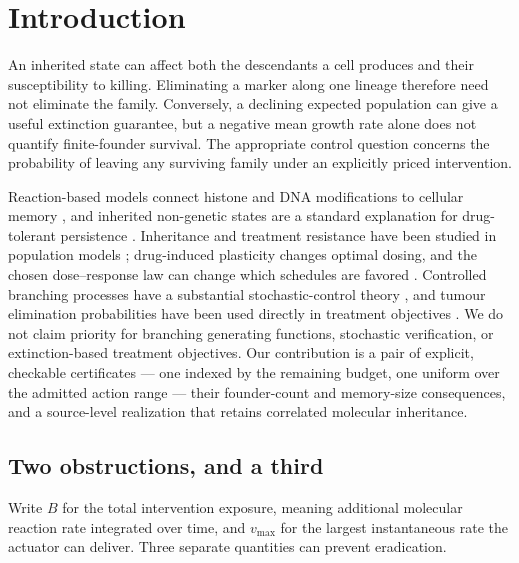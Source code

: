 \section{Introduction}
\label{sec:intro}

An inherited state can affect both the descendants a cell produces and their
susceptibility to killing. Eliminating a marker along one lineage therefore
need not eliminate the family. Conversely, a declining expected population can
give a useful extinction guarantee, but a negative mean growth rate alone does
not quantify finite-founder survival. The appropriate control question concerns
the probability of leaving any surviving family under an explicitly priced
intervention.

Reaction-based models connect histone and DNA modifications to cellular memory
\citep{dodd2007,bruno,bruno2024}, and inherited non-genetic states are a
standard explanation for drug-tolerant persistence
\citep{balaban2004,sharma2010,shaffer2017,oren2021}. Inheritance and treatment
resistance have been studied in population models \citep{cassidy}; drug-induced
plasticity changes optimal dosing, and the chosen dose--response law can change
which schedules are favored \citep{gunnarsson}. Controlled branching processes
have a substantial stochastic-control theory \citep{claisse,kimmel2015}, and
tumour elimination probabilities have been used directly in treatment
objectives \citep{burroughs}. We do not claim priority for branching generating
functions, stochastic verification, or extinction-based treatment objectives.
Our contribution is a pair of explicit, checkable certificates --- one indexed
by the remaining budget, one uniform over the admitted action range --- their
founder-count and memory-size consequences, and a source-level realization that
retains correlated molecular inheritance.

\subsection*{Two obstructions, and a third}

Write $B$ for the total intervention exposure, meaning additional molecular
reaction rate integrated over time, and $v_{\max}$ for the largest instantaneous
rate the actuator can deliver. Three separate quantities can prevent
eradication.

